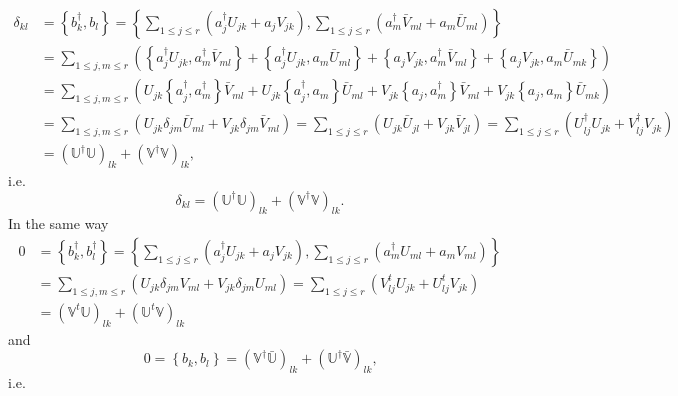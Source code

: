 \documentclass[aps, preprint]{revtex4}
\begin{document}
\begin{align}\delta _{k l} &  =\left \{b_{k}^{ \dag } ,b_{l}\right \} =\left \{\sum _{1 \leq j \leq r}\left (a_{j}^{ \dag } U_{j k} +a_{j} V_{j k}\right ) ,\sum _{1 \leq j \leq r}\left (a_{m}^{ \dag } \bar{V}_{m l} +a_{m} \bar{U}_{m l}\right )\right \} \nonumber  \\
 &  =\sum _{1 \leq j ,m \leq r}\left (\left \{a_{j}^{ \dag } U_{j k} ,a_{m}^{ \dag } \bar{V}_{m l}\right \} +\left \{a_{j}^{ \dag } U_{j k} ,a_{m} \bar{U}_{m l}\right \} +\left \{a_{j} V_{j k} ,a_{m}^{ \dag } \bar{V}_{m l}\right \} +\left \{a_{j} V_{j k} ,a_{m} \bar{U}_{m k}\right \}\right ) \nonumber  \\
 &  =\sum _{1 \leq j ,m \leq r}\left (U_{j k} \left \{a_{j}^{ \dag } ,a_{m}^{ \dag }\right \}\bar{V}_{m l} +U_{j k} \left \{a_{j}^{ \dag } ,a_{m}\right \}\bar{U}_{m l} +V_{j k} \left \{a_{j} ,a_{m}^{ \dag }\right \}\bar{V}_{m l} +V_{j k} \left \{a_{j} ,a_{m}\right \}\bar{U}_{m k}\right ) \nonumber  \\
 &  =\sum _{1 \leq j ,m \leq r}\left (U_{j k} \delta _{j m} \bar{U}_{m l} +V_{j k} \delta _{j m} \bar{V}_{m l}\right ) =\sum _{1 \leq j \leq r}\left (U_{j k} \bar{U}_{j l} +V_{j k} \bar{V}_{j l}\right ) =\sum _{1 \leq j \leq r}\left (U_{l j}^{ \dag } U_{j k} +V_{l j}^{ \dag } V_{j k}\right ) \nonumber  \\
 &  =\left (\mathbb{U}^{ \dag } \mathbb{U}\right )_{l k} +\left (\mathbb{V}^{ \dag } \mathbb{V}\right )_{l k}\text{,}\end{align}i.e.
\begin{equation}\delta _{k l} =\left (\mathbb{U}^{ \dag } \mathbb{U}\right )_{l k} +\left (\mathbb{V}^{ \dag } \mathbb{V}\right )_{l k}\text{.}
\end{equation}In the same way
\begin{align}0 &  =\left \{b_{k}^{ \dag } ,b_{l}^{ \dag }\right \} =\left \{\sum _{1 \leq j \leq r}\left (a_{j}^{ \dag } U_{j k} +a_{j} V_{j k}\right ) ,\sum _{1 \leq j \leq r}\left (a_{m}^{ \dag } U_{m l} +a_{m} V_{m l}\right )\right \} \nonumber  \\
 &  =\sum _{1 \leq j ,m \leq r}\left (U_{j k} \delta _{j m} V_{m l} +V_{j k} \delta _{j m} U_{m l}\right ) =\sum _{1 \leq j \leq r}\left (V_{l j}^{t} U_{j k} +U_{l j}^{t} V_{j k}\right ) \nonumber  \\
 &  =\left (\mathbb{V}^{t} \mathbb{U}\right )_{l k} +\left (\mathbb{U}^{t} \mathbb{V}\right )_{l k}\end{align}and
\begin{equation}0 =\left \{b_{k} ,b_{l}\right \} =\left (\mathbb{V}^{ \dag } \bar{\mathbb{U}}\right )_{l k} +\left (\mathbb{U}^{ \dag } \bar{\mathbb{V}}\right )_{l k}\text{,}
\end{equation}i.e.
\end{document}
